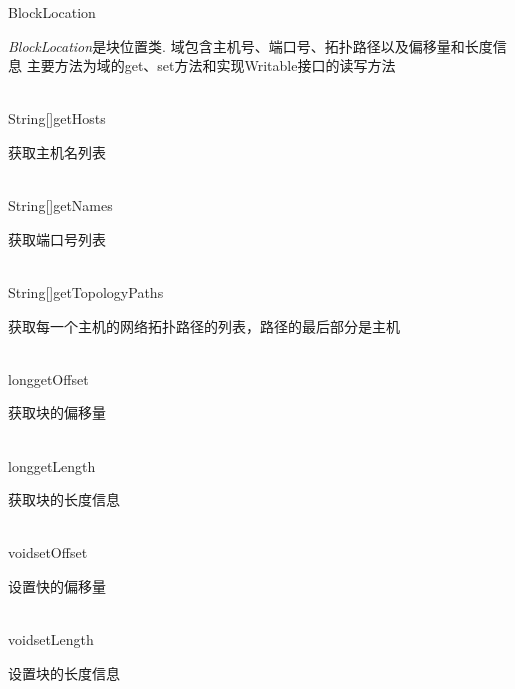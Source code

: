\begin{XeClass}{BlockLocation}
   
 \emph{BlockLocation}是块位置类.
 域包含主机号、端口号、拓扑路径以及偏移量和长度信息
 主要方法为域的get、set方法和实现Writable接口的读写方法

  \begin{XeMethod}{\XePublic\\ }{String[]}{getHosts}
       
 获取主机名列表

  \end{XeMethod}

  \begin{XeMethod}{\XePublic\\ }{String[]}{getNames}
       
 获取端口号列表

  \end{XeMethod}

  \begin{XeMethod}{\XePublic\\ }{String[]}{getTopologyPaths}
       
 获取每一个主机的网络拓扑路径的列表，路径的最后部分是主机

  \end{XeMethod}

  \begin{XeMethod}{\XePublic\\ }{long}{getOffset}
       
 获取块的偏移量

  \end{XeMethod}

  \begin{XeMethod}{\XePublic\\ }{long}{getLength}
       
 获取块的长度信息

  \end{XeMethod}

  \begin{XeMethod}{\XePublic\\ }{void}{setOffset}
       
 设置快的偏移量

  \end{XeMethod}

  \begin{XeMethod}{\XePublic\\ }{void}{setLength}
       
 设置块的长度信息


\end{XeMethod}
\end{XeClass}
